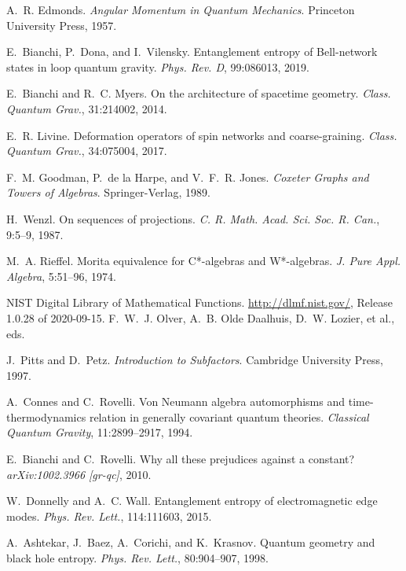 \documentclass[11pt]{article}
\begin{document}
\begin{thebibliography}{9}
  A.~R. Edmonds.
  \newblock \emph{Angular Momentum in Quantum Mechanics}.
  \newblock Princeton University Press, 1957.

  E.~Bianchi, P.~Dona, and I.~Vilensky.
  \newblock Entanglement entropy of Bell-network states in loop quantum gravity.
  \newblock \emph{Phys. Rev. D}, 99:086013, 2019.

  E.~Bianchi and R.~C. Myers.
  \newblock On the architecture of spacetime geometry.
  \newblock \emph{Class. Quantum Grav.}, 31:214002, 2014.

  E.~R. Livine.
  \newblock Deformation operators of spin networks and coarse-graining.
  \newblock \emph{Class. Quantum Grav.}, 34:075004, 2017.

  F.~M. Goodman, P.~de la Harpe, and V.~F.~R. Jones.
  \newblock \emph{Coxeter Graphs and Towers of Algebras}.
  \newblock Springer-Verlag, 1989.

  H.~Wenzl.
  \newblock On sequences of projections.
  \newblock \emph{C. R. Math. Acad. Sci. Soc. R. Can.}, 9:5--9, 1987.

  M.~A. Rieffel.
  \newblock Morita equivalence for C*-algebras and W*-algebras.
  \newblock \emph{J. Pure Appl. Algebra}, 5:51--96, 1974.

  NIST Digital Library of Mathematical Functions.
  \newblock \url{http://dlmf.nist.gov/}, Release 1.0.28 of 2020-09-15.
  \newblock F.~W.~J. Olver, A.~B. Olde Daalhuis, D.~W. Lozier, et al., eds.

  J.~Pitts and D.~Petz.
  \newblock \emph{Introduction to Subfactors}.
  \newblock Cambridge University Press, 1997.

  A.~Connes and C.~Rovelli.
  \newblock Von Neumann algebra automorphisms and time-thermodynamics relation in generally covariant quantum theories.
  \newblock \emph{Classical Quantum Gravity}, 11:2899--2917, 1994.

  E.~Bianchi and C.~Rovelli.
  \newblock Why all these prejudices against a constant?
  \newblock \emph{arXiv:1002.3966 [gr-qc]}, 2010.

  W.~Donnelly and A.~C. Wall.
  \newblock Entanglement entropy of electromagnetic edge modes.
  \newblock \emph{Phys. Rev. Lett.}, 114:111603, 2015.

  A.~Ashtekar, J.~Baez, A.~Corichi, and K.~Krasnov.
  \newblock Quantum geometry and black hole entropy.
  \newblock \emph{Phys. Rev. Lett.}, 80:904--907, 1998.

\end{thebibliography}
\end{document}
